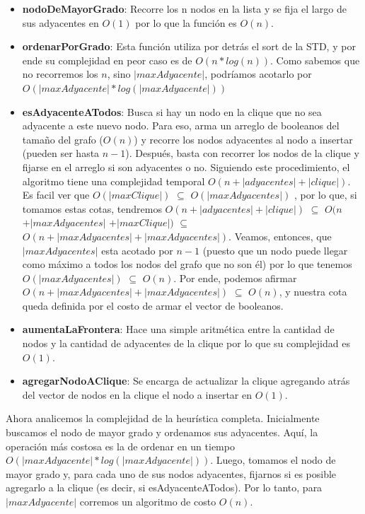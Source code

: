 \begin{itemize}
    \item \textbf{nodoDeMayorGrado}: Recorre los n nodos en la lista y se fija el largo de sus adyacentes en $O(1)$ por lo que la función es $O(n)$.

	\item \textbf{ordenarPorGrado}: Esta función utiliza por detrás el sort de la STD, y por ende su complejidad en peor caso es de $O(n*log(n))$. Como sabemos que no recorremos los $n$, sino $|maxAdyacente|$,  podríamos acotarlo por $O(|maxAdyacente|*log(|maxAdyacente|))$

    \item \textbf{esAdyacenteATodos}: Busca si hay un nodo en la clique que no sea adyacente a este nuevo nodo. Para eso, arma un arreglo de booleanos del tamaño del grafo ($O(n)$) y recorre los nodos adyacentes al nodo a insertar (pueden ser hasta $n-1$). Después, basta con recorrer los nodos de la clique y fijarse en el arreglo si son adyacentes o no. Siguiendo este procedimiento, el algoritmo tiene una complejidad temporal $O(n + |adyacentes| + |clique|)$. Es facil ver que $O(|maxClique|)$ $\subseteq$ $O(|maxAdyacentes|)$ , por lo que, si tomamos estas cotas, tendremos $O(n + |adyacentes| + |clique|)$ $\subseteq$ $O(n$ $+ |maxAdyacentes|$ $+ |maxClique|)$ $\subseteq$ $O(n + |maxAdyacentes| + |maxAdyacentes|)$. Veamos, entonces, que $|maxAdyacentes|$ esta acotado por $n - 1$ (puesto que un nodo puede llegar como máximo a todos los nodos del grafo que no son él) por lo que tenemos $O(|maxAdyacentes|)$ $\subseteq$ $O(n)$. Por ende, podemos afirmar $O(n + |maxAdyacentes| + |maxAdyacentes|)$ $\subseteq$ $O(n)$, y nuestra cota queda definida por el costo de armar el vector de booleanos.

    \item \textbf{aumentaLaFrontera}: Hace una simple aritmética entre la cantidad de nodos y la cantidad de adyacentes de la clique por lo que su complejidad es $O(1)$.

    \item \textbf{agregarNodoAClique}: Se encarga de actualizar la clique agregando atrás del vector de nodos en la clique el nodo a insertar en $O(1)$.

\end{itemize}

Ahora analicemos la complejidad de la heurística completa. Inicialmente buscamos el nodo de mayor grado y ordenamos sus adyacentes. Aquí, la operación más costosa es la de ordenar en un tiempo $O(|maxAdyacente|*log (|maxAdyacente|))$. Luego, tomamos el nodo de mayor grado y, para cada uno de sus nodos adyacentes, fijarnos si es posible agregarlo a la clique (es decir, si esAdyacenteATodos). Por lo tanto, para $|maxAdyacente|$ corremos un algoritmo de costo $O(n)$.

